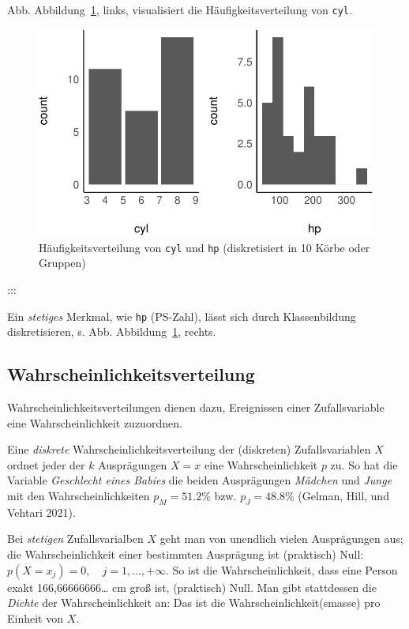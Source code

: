 \documentclass[
  a4paper,
  DIV=11]{scrreprt}
\theoremstyle{definition}
\theoremstyle{remark}
\begin{document}
Abb. Abbildung~\ref{fig-mtcars-freq}, links, visualisiert die
Häufigkeitsverteilung von \texttt{cyl}.

\begin{figure}

{\centering \includegraphics{./Verteilungen_files/figure-pdf/fig-mtcars-freq-1.pdf}

}

\caption{\label{fig-mtcars-freq}Häufigkeitsverteilung von \texttt{cyl}
und \texttt{hp} (diskretisiert in 10 Körbe oder Gruppen)}

\end{figure}

:::

Ein \emph{stetiges} Merkmal, wie \texttt{hp} (PS-Zahl), lässt sich durch
Klassenbildung diskretisieren, s. Abb. Abbildung~\ref{fig-mtcars-freq},
rechts.

\hypertarget{wahrscheinlichkeitsverteilung}{%
\subsection{Wahrscheinlichkeitsverteilung}\label{wahrscheinlichkeitsverteilung}}

Wahrscheinlichkeitsverteilungen dienen dazu, Ereignissen einer
Zufallsvariable eine Wahrscheinlichkeit zuzuordnen.

Eine \emph{diskrete} Wahrscheinlichkeitsverteilung der (diskreten)
Zufallsvariablen \(X\) ordnet jeder der \(k\) Ausprägungen \(X=x\) eine
Wahrscheinlichkeit \(p\) zu. So hat die Variable \emph{Geschlecht eines
Babies} die beiden Ausprägungen \emph{Mädchen} und \emph{Junge} mit den
Wahrscheinlichkeiten \(p_M = 51.2\%\) bzw. \(p_J = 48.8\%\) (Gelman,
Hill, und Vehtari 2021).

Bei \emph{stetigen} Zufallsvarialben \(X\) geht man von unendlich vielen
Ausprägungen aus; die Wahrscheinlichkeit einer bestimmten Ausprägung ist
(praktisch) Null: \(p(X=x_j)=0, \quad j=1,...,+\infty\). So ist die
Wahrscheinlichkeit, dass eine Person exakt 166,66666666\ldots{} cm groß
ist, (praktisch) Null. Man gibt stattdessen die \emph{Dichte} der
Wahrscheinlichkeit an: Das ist die Wahrscheinlichkeit(smasse) pro
Einheit von \(X\).
\end{document}
